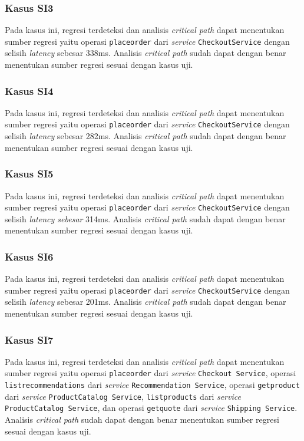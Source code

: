 \subsubsection{Kasus SI3}
Pada kasus ini, regresi terdeteksi dan analisis \textit{critical path} dapat menentukan sumber regresi yaitu operasi \texttt{placeorder} dari \textit{service} \texttt{CheckoutService} dengan selisih \textit{latency} sebesar 338ms. Analisis \textit{critical path} sudah dapat dengan benar menentukan sumber regresi sesuai dengan kasus uji.

\subsubsection{Kasus SI4}
Pada kasus ini, regresi terdeteksi dan analisis \textit{critical path} dapat menentukan sumber regresi yaitu operasi \texttt{placeorder} dari \textit{service} \texttt{CheckoutService} dengan selisih \textit{latency} sebesar 282ms. Analisis \textit{critical path} sudah dapat dengan benar menentukan sumber regresi sesuai dengan kasus uji.

\subsubsection{Kasus SI5}
Pada kasus ini, regresi terdeteksi dan analisis \textit{critical path} dapat menentukan sumber regresi yaitu operasi \texttt{placeorder} dari \textit{service} \texttt{CheckoutService} dengan selisih \textit{latency sebesar} 314ms. Analisis \textit{critical path} sudah dapat dengan benar menentukan sumber regresi sesuai dengan kasus uji.


\subsubsection{Kasus SI6}
Pada kasus ini, regresi terdeteksi dan analisis \textit{critical path} dapat menentukan sumber regresi yaitu operasi \texttt{placeorder} dari \textit{service} \texttt{CheckoutService} dengan selisih \textit{latency} sebesar 201ms. Analisis \textit{critical path} sudah dapat dengan benar menentukan sumber regresi sesuai dengan kasus uji.


\subsubsection{Kasus SI7}
Pada kasus ini, regresi terdeteksi dan analisis \textit{critical path} dapat menentukan sumber regresi yaitu operasi \texttt{placeorder} dari \textit{service} \texttt{Checkout Service}, operasi \texttt{listrecommendations} dari \textit{service} \texttt{Recommendation Service}, operasi \texttt{getproduct} dari \textit{service} \texttt{ProductCatalog Service}, \texttt{listproducts} dari \textit{service} \texttt{ProductCatalog Service}, dan operasi \texttt{getquote} dari \textit{service} \texttt{Shipping Service}. Analisis \textit{critical path} sudah dapat dengan benar menentukan sumber regresi sesuai dengan kasus uji.


